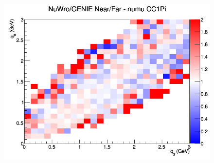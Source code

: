 \documentclass[12pt]{article}
\begin{document}
\begin{figure}[h]
\endminipage
{}
\includegraphics[width=\linewidth]{eff_q0_q3/FGT/ratios/CC1Pi_NuWro_GENIE_numu_NF_q3_q0.png}
\endminipage
\newline
\end{figure}
\clearpage
\end{document}
